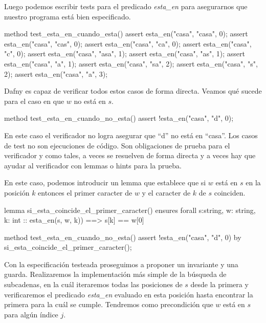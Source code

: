 \documentclass[12pt, a4paper, openany, fleqn]{book}
\begin{document}
    Luego podemos escribir tests para el predicado \textit{esta\_en} para asegurarnos que nuestro programa está bien especificado.

    \begin{dafny}
method test_esta_en_cuando_esta(){
  assert esta_en("casa", "casa", 0);
  assert esta_en("casa", "cas", 0);
  assert esta_en("casa", "ca", 0);
  assert esta_en("casa", "c", 0);
  assert esta_en("casa", "asa", 1);
  assert esta_en("casa", "as", 1);
  assert esta_en("casa", "a", 1);
  assert esta_en("casa", "sa", 2);
  assert esta_en("casa", "s", 2);
  assert esta_en("casa", "a", 3);
}
    \end{dafny}

    Dafny es capaz de verificar todos estos casos de forma directa. Veamos qué sucede para el caso en que $w$ no está en $s$.

    \begin{dafny}
method test_esta_en_cuando_no_esta(){
    assert !esta_en("casa", "d", 0);
}
    \end{dafny}

    En este caso el verificador no logra asegurar que ``d'' no está en ``casa''. Los casos de test no son ejecuciones de código. Son obligaciones de prueba para el verificador y como tales, a veces se resuelven de forma directa y a veces hay que ayudar al verificador con lemmas o hints para la prueba.

    En este caso, podemos introducir un lemma que establece que si $w$ está en $s$ en la posición $k$ entonces el primer caracter de $w$ y el caracter de $k$ de $s$ coinciden.

    \begin{dafny}
lemma si_esta_coincide_el_primer_caracter()
    ensures forall s:string, w: string, k: int ::
                esta_en(s, w, k)) ==> s[k] == w[0]
{
}

method test_esta_en_cuando_no_esta(){
    assert !esta_en("casa", "d", 0) by {
        si_esta_coincide_el_primer_caracter();
    }
}
    \end{dafny}

    Con la especificación testeada proseguimos a proponer un invariante y una guarda. Realizaremos la implementación más simple de la búsqueda de subcadenas, en la cuál iteraremos todas las posiciones de $s$ desde la primera y verificaremos el predicado \textit{esta\_en} evaluado en esta posición hasta encontrar la primera para la cuál se cumple. Tendremos como precondición que $w$ está en $s$ para algún índice $j$.
\end{document}
